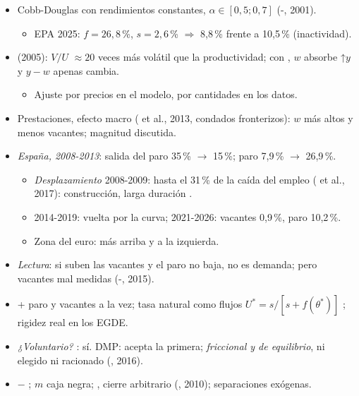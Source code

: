 \documentclass{article}
\begin{document}
\begin{columnas}
\begin{itemize}
\item Cobb-Douglas con rendimientos constantes, $\alpha\in[0{,}5;0{,}7]$ (-, 2001).
  \begin{itemize}
  \item EPA 2025: $f=26{,}8$\,\%, $s=2{,}6$\,\% $\Rightarrow$ 8,8\,\% frente a 10,5\,\% (inactividad).
  \end{itemize}
\item {} (2005): $V/U$ $\approx20$ veces más volátil que la productividad; con , $w$ absorbe ↑$y$ y $y-w$ apenas cambia.
  \begin{itemize}
  \item Ajuste por precios en el modelo, por cantidades en los datos.
  \end{itemize}
\item Prestaciones, efecto macro ( et al., 2013, condados fronterizos): $w$ más altos y menos vacantes; magnitud discutida.
\end{itemize}
\begin{itemize}
\item \emph{España, 2008-2013}: salida del paro 35\,\% $\to$ 15\,\%; paro 7,9\,\% $\to$ 26,9\,\%.
  \begin{itemize}
  \item \emph{Desplazamiento} 2008-2009: hasta el 31\,\% de la caída del empleo ( et al., 2017): construcción, larga duración .
  \item 2014-2019: vuelta por la curva; 2021-2026: vacantes 0,9\,\%, paro 10,2\,\%.
  \item Zona del euro: más arriba y a la izquierda.
  \end{itemize}
\item \emph{Lectura}: si suben las vacantes y el paro no baja, no es demanda; pero vacantes mal medidas (-, 2015).
\end{itemize}

\begin{itemize}
\item + paro y vacantes a la vez; tasa natural como flujos $U^*=s/[s+f(\theta^*)]$ ; rigidez real en los EGDE.
\item \emph{¿Voluntario?} : sí. DMP: acepta la primera; \emph{friccional y de equilibrio}, ni elegido ni racionado  (, 2016).
\item $-$ ; $m$ caja negra; , cierre arbitrario (, 2010); separaciones exógenas.
\end{itemize}


\end{columnas}
\end{document}
